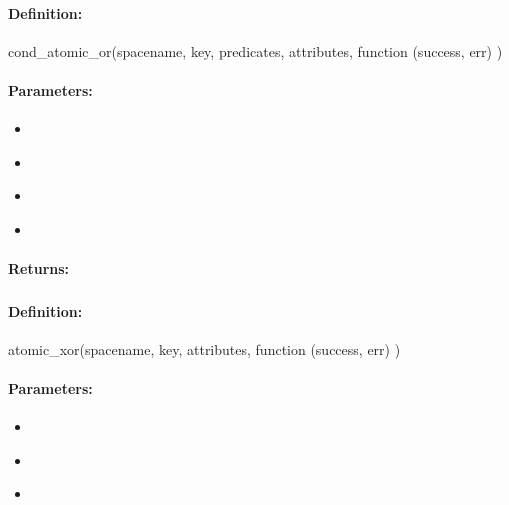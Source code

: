 \paragraph{Definition:}
\begin{javascriptcode}
cond_atomic_or(spacename, key, predicates, attributes, function (success, err) {})
\end{javascriptcode}
\paragraph{Parameters:}
\begin{itemize}[noitemsep]
\item {}\\

\item {}\\

\item {}\\

\item {}\\

\end{itemize}

\paragraph{Returns:}


\pagebreak
\subsubsection{}
\label{api:nodejs:atomic_xor}


\paragraph{Definition:}
\begin{javascriptcode}
atomic_xor(spacename, key, attributes, function (success, err) {})
\end{javascriptcode}
\paragraph{Parameters:}
\begin{itemize}[noitemsep]
\item {}\\

\item {}\\

\item {}\\

\end{itemize}

